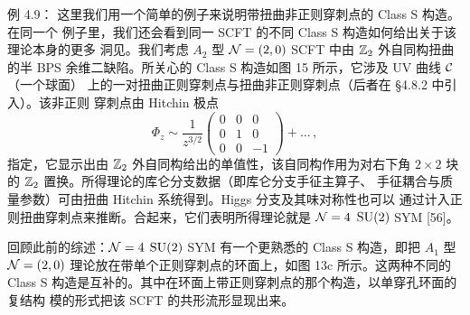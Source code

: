 \begin{examplebox}{例 4.9：}
  这里我们用一个简单的例子来说明带扭曲非正则穿刺点的 Class S 构造。在同一个
  例子里，我们还会看到同一 SCFT 的不同 Class S 构造如何给出关于该理论本身的更多
  洞见。我们考虑 $A_2$ 型 $\mathcal{N}=(2,0)$ SCFT 中由 $\mathbb{Z}_2$ 外自同构扭曲的半 BPS
  余维二缺陷。所关心的 Class S 构造如图 15 所示，它涉及 UV 曲线 $\mathcal{C}$（一个球面）
  上的一对扭曲正则穿刺点与扭曲非正则穿刺点（后者在 §4.8.2 中引入）。该非正则
  穿刺点由 Hitchin 极点
  \begin{equation}
    \Phi_z \sim \frac{1}{z^{3/2}}
    \begin{pmatrix} 0 & 0 & 0 \\ 0 & 1 & 0 \\ 0 & 0 & -1 \end{pmatrix}
    + \ldots\,,
    \tag{4.33}
  \end{equation}
  指定，它显示出由 $\mathbb{Z}_2$ 外自同构给出的单值性，该自同构作用为对右下角
  $2\times2$ 块的 $\mathbb{Z}_2$ 置换。所得理论的库仑分支数据（即库仑分支手征主算子、
  手征耦合与质量参数）可由扭曲 Hitchin 系统得到。Higgs 分支及其味对称性也可以
  通过计入正则扭曲穿刺点来推断。合起来，它们表明所得理论就是 $\mathcal{N}=4$ $\mathrm{SU}(2)$
  SYM [56]。

  回顾此前的综述：$\mathcal{N}=4$ $\mathrm{SU}(2)$ SYM 有一个更熟悉的 Class S 构造，即把 $A_1$ 型
  $\mathcal{N}=(2,0)$ 理论放在带单个正则穿刺点的环面上，如图 13c 所示。这两种不同的
  Class S 构造是互补的。其中在环面上带正则穿刺点的那个构造，以单穿孔环面的复结构
  模的形式把该 SCFT 的共形流形显现出来。
\end{examplebox}



